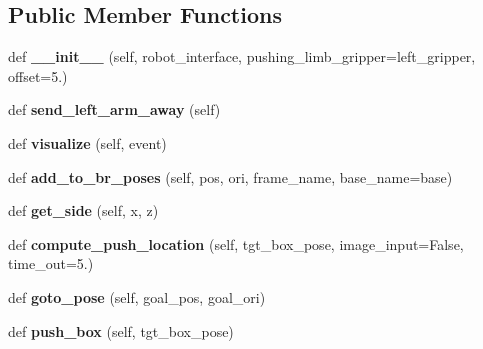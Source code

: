 \subsection*{Public Member Functions}
\begin{DoxyCompactItemize}
\item 
\hypertarget{classaml__demos_1_1stochastic__pushing__machine_1_1_stochastic_push_machine_acd6e2f6eaa522161df8cbb80b11071f8}{}\label{classaml__demos_1_1stochastic__pushing__machine_1_1_stochastic_push_machine_acd6e2f6eaa522161df8cbb80b11071f8} 
def {\bfseries \+\_\+\+\_\+init\+\_\+\+\_\+} (self, robot\+\_\+interface, pushing\+\_\+limb\+\_\+gripper=\textquotesingle{}left\+\_\+gripper\textquotesingle{}, offset=5.)
\item 
\hypertarget{classaml__demos_1_1stochastic__pushing__machine_1_1_stochastic_push_machine_a7b9aee49032eb32d46eba394d4f80d48}{}\label{classaml__demos_1_1stochastic__pushing__machine_1_1_stochastic_push_machine_a7b9aee49032eb32d46eba394d4f80d48} 
def {\bfseries send\+\_\+left\+\_\+arm\+\_\+away} (self)
\item 
\hypertarget{classaml__demos_1_1stochastic__pushing__machine_1_1_stochastic_push_machine_a249762fdeb81bea36847c55f26458d84}{}\label{classaml__demos_1_1stochastic__pushing__machine_1_1_stochastic_push_machine_a249762fdeb81bea36847c55f26458d84} 
def {\bfseries visualize} (self, event)
\item 
\hypertarget{classaml__demos_1_1stochastic__pushing__machine_1_1_stochastic_push_machine_a4bf5d2100813102cfc965162cefc3611}{}\label{classaml__demos_1_1stochastic__pushing__machine_1_1_stochastic_push_machine_a4bf5d2100813102cfc965162cefc3611} 
def {\bfseries add\+\_\+to\+\_\+br\+\_\+poses} (self, pos, ori, frame\+\_\+name, base\+\_\+name=\textquotesingle{}base\textquotesingle{})
\item 
\hypertarget{classaml__demos_1_1stochastic__pushing__machine_1_1_stochastic_push_machine_a29a9c82ffe4d0ce6a0ae5978d4ab9302}{}\label{classaml__demos_1_1stochastic__pushing__machine_1_1_stochastic_push_machine_a29a9c82ffe4d0ce6a0ae5978d4ab9302} 
def {\bfseries get\+\_\+side} (self, x, z)
\item 
\hypertarget{classaml__demos_1_1stochastic__pushing__machine_1_1_stochastic_push_machine_a14a0ec63e212d4cb3fe1fe48a16b6e81}{}\label{classaml__demos_1_1stochastic__pushing__machine_1_1_stochastic_push_machine_a14a0ec63e212d4cb3fe1fe48a16b6e81} 
def {\bfseries compute\+\_\+push\+\_\+location} (self, tgt\+\_\+box\+\_\+pose, image\+\_\+input=False, time\+\_\+out=5.)
\item 
\hypertarget{classaml__demos_1_1stochastic__pushing__machine_1_1_stochastic_push_machine_a3129d99f69a8f4a4f874a14d2c83b291}{}\label{classaml__demos_1_1stochastic__pushing__machine_1_1_stochastic_push_machine_a3129d99f69a8f4a4f874a14d2c83b291} 
def {\bfseries goto\+\_\+pose} (self, goal\+\_\+pos, goal\+\_\+ori)
\item 
\hypertarget{classaml__demos_1_1stochastic__pushing__machine_1_1_stochastic_push_machine_a122cf00046d99854676b91391caeb028}{}\label{classaml__demos_1_1stochastic__pushing__machine_1_1_stochastic_push_machine_a122cf00046d99854676b91391caeb028} 
def {\bfseries push\+\_\+box} (self, tgt\+\_\+box\+\_\+pose)
\end{DoxyCompactItemize}


